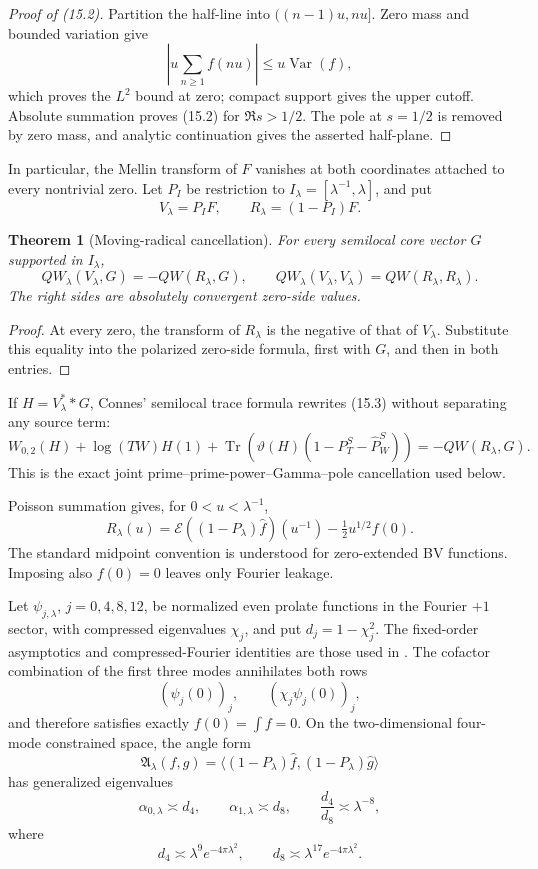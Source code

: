 \documentclass[11pt]{amsart}
\newtheorem{theorem}{Theorem}[section]
\theoremstyle{definition}
\theoremstyle{remark}
\newcommand{\Tr}{\operatorname{Tr}}
\begin{document}
\begin{proof}[Proof of (15.2)]
Partition the half-line into \(((n-1)u,nu]\).  Zero mass and bounded
variation give
\[
 \left|u\sum_{n\ge1}f(nu)\right|
 \le u\operatorname {Var}(f),
\]
which proves the \(L^2\) bound at zero; compact support gives the upper
cutoff.  Absolute summation proves (15.2) for \(\Re s>1/2\).  The pole at
\(s=1/2\) is removed by zero mass, and analytic continuation gives the
asserted half-plane.
\end{proof}

In particular, the Mellin transform of \(F\) vanishes at both coordinates
attached to every nontrivial zero.  Let \(P_I\) be restriction to
\(I_\lambda=[\lambda^{-1},\lambda]\), and put
\[
 V_\lambda=P_IF,
 \qquad R_\lambda=(1-P_I)F.
\]

\begin{theorem}[Moving-radical cancellation]
\label{thm:moving-radical}
For every semilocal core vector \(G\) supported in \(I_\lambda\),
\[
 \boxed{
 QW_\lambda(V_\lambda,G)=-QW(R_\lambda,G),
 \qquad
 QW_\lambda(V_\lambda,V_\lambda)=QW(R_\lambda,R_\lambda).}
 \tag{15.3}
\]
The right sides are absolutely convergent zero-side values.
\end{theorem}

\begin{proof}
At every zero, the transform of \(R_\lambda\) is the negative of that of
\(V_\lambda\).  Substitute this equality into the polarized zero-side
formula, first with \(G\), and then in both entries.
\end{proof}

If \(H=V_\lambda^**G\), Connes' semilocal trace formula
\cite{Connes2026} rewrites (15.3)
without separating any source term:
\[
\boxed{
 W_{0,2}(H)+\log(TW)H(1)
 +\Tr\!\left(\vartheta(H)
 (1-P_T^S-\widehat P_W^S)\right)
 =-QW(R_\lambda,G).}
\tag{15.4}
\]
This is the exact joint prime--prime-power--Gamma--pole cancellation used
below.

Poisson summation gives, for \(0<u<\lambda^{-1}\),
\[
 R_\lambda(u)
 =\mathcal E((1-P_\lambda)\widehat f)(u^{-1})
 -\tfrac12u^{1/2}f(0).
 \tag{15.5}
\]
The standard midpoint convention is understood for zero-extended BV
functions.  Imposing also \(f(0)=0\) leaves only Fourier leakage.

Let \(\psi_{j,\lambda}\), \(j=0,4,8,12\), be normalized even prolate
functions in the Fourier \(+1\) sector, with compressed eigenvalues
\(\chi_j\), and put \(d_j=1-\chi_j^2\).  The fixed-order asymptotics and
compressed-Fourier identities are those used in \cite{CCM}.  The cofactor
combination of the
first three modes annihilates both rows
\[
 (\psi_j(0))_j,
 \qquad (\chi_j\psi_j(0))_j,
\]
and therefore satisfies exactly \(f(0)=\int f=0\).  On the two-dimensional
four-mode constrained space, the angle form
\[
 \mathfrak A_\lambda(f,g)
 =\langle(1-P_\lambda)\widehat f,
          (1-P_\lambda)\widehat g\rangle
\]
has generalized eigenvalues
\[
 \boxed{
 \alpha_{0,\lambda}\asymp d_4,
 \qquad
 \alpha_{1,\lambda}\asymp d_8,
 \qquad
 \frac{d_4}{d_8}\asymp\lambda^{-8},}
 \tag{15.6}
\]
where
\[
 d_4\asymp\lambda^9e^{-4\pi\lambda^2},
 \qquad d_8\asymp\lambda^{17}e^{-4\pi\lambda^2}.
 \tag{15.7}
\]
\end{document}
